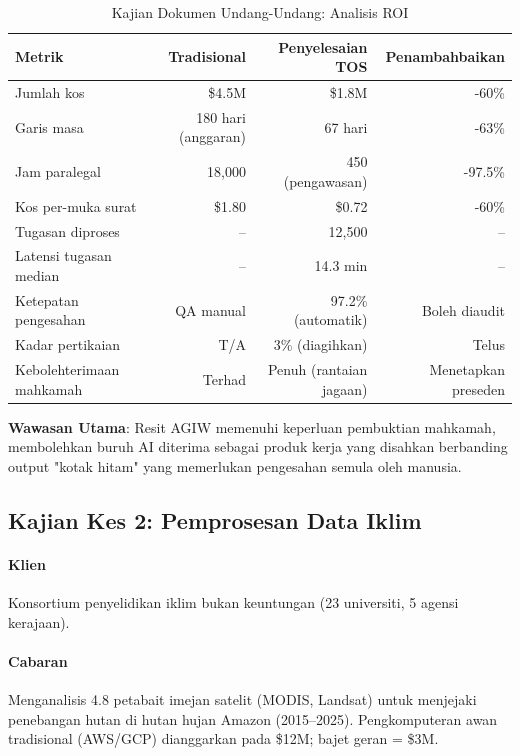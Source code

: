 \documentclass[11pt]{article}
\begin{document}
\begin{table}[H]
\centering
\caption{Kajian Dokumen Undang-Undang: Analisis ROI}
\label{tab:legal-roi}
\begin{tabular}{@{}lrrr@{}}
\toprule
\textbf{Metrik} & \textbf{Tradisional} & \textbf{Penyelesaian TOS} & \textbf{Penambahbaikan} \\ \midrule
Jumlah kos & \$4.5M & \$1.8M & -60\% \\
Garis masa & 180 hari (anggaran) & 67 hari & -63\% \\
Jam paralegal & 18,000 & 450 (pengawasan) & -97.5\% \\
Kos per-muka surat & \$1.80 & \$0.72 & -60\% \\
Tugasan diproses & -- & 12,500 & -- \\
Latensi tugasan median & -- & 14.3 min & -- \\
Ketepatan pengesahan & QA manual & 97.2\% (automatik) & Boleh diaudit \\
Kadar pertikaian & T/A & 3\% (diagihkan) & Telus \\
Kebolehterimaan mahkamah & Terhad & Penuh (rantaian jagaan) & Menetapkan preseden \\
\bottomrule
\end{tabular}
\end{table}

\textbf{Wawasan Utama}: Resit AGIW memenuhi keperluan pembuktian mahkamah, membolehkan buruh AI diterima sebagai produk kerja yang disahkan berbanding output "kotak hitam" yang memerlukan pengesahan semula oleh manusia.

\subsection{Kajian Kes 2: Pemprosesan Data Iklim}

\paragraph{Klien} Konsortium penyelidikan iklim bukan keuntungan (23 universiti, 5 agensi kerajaan).

\paragraph{Cabaran} Menganalisis 4.8 petabait imejan satelit (MODIS, Landsat) untuk menjejaki penebangan hutan di hutan hujan Amazon (2015--2025). Pengkomputeran awan tradisional (AWS/GCP) dianggarkan pada \$12M; bajet geran = \$3M.
\end{document}
